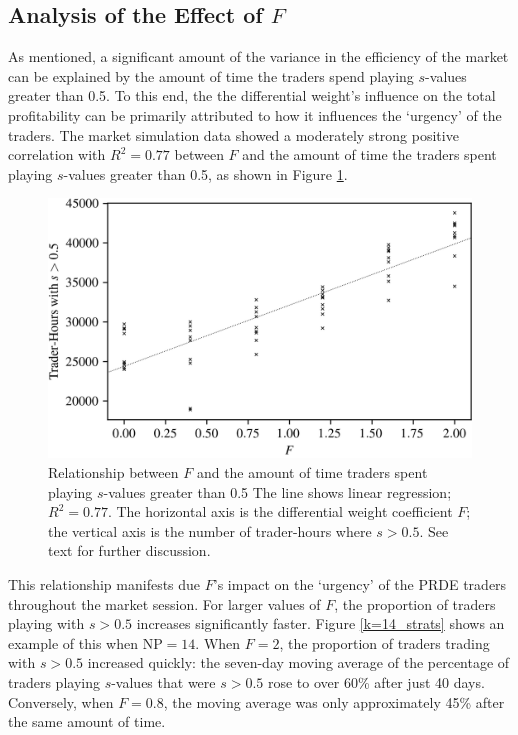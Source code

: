 \documentclass[conference]{IEEEtran}
\begin{document}
\subsection{Analysis of the Effect of $F$}

As mentioned, a significant amount of the variance in the efficiency of the market can be explained by the amount of time the traders spend playing $s$-values greater than 0.5.
To this end, the the differential weight's influence on the total profitability can be primarily attributed to how it influences the `urgency' of the traders.
The market simulation data showed a moderately strong positive correlation with $R^2=0.77$ between $F$ and the amount of time the traders spent playing $s$-values greater than 0.5, as shown in Figure \ref{F_strats}.

\begin{figure}[htbp]
    \centerline{\includegraphics[width=\columnwidth]{F_strats.png}}
    \caption{
        Relationship between $F$ and the amount of time traders spent playing $s$-values greater than 0.5
        The line shows linear regression; $R^2=0.77$.
        The horizontal axis is the differential weight coefficient $F$; the vertical axis is the number of trader-hours where $s>0.5$.
        See text for further discussion.
    }
    \label{F_strats}
\end{figure}

This relationship manifests due $F$'s impact on the `urgency' of the PRDE traders throughout the market session.
For larger values of $F$, the proportion of traders playing with $s>0.5$ increases significantly faster.
Figure \ref{k=14_strats} shows an example of this when $\mathrm{NP}=14$.
When $F=2$, the proportion of traders trading with $s>0.5$ increased quickly: the seven-day moving average of the percentage of traders playing $s$-values that were $s>0.5$ rose to over 60\% after just 40 days.
Conversely, when $F=0.8$, the moving average was only approximately 45\% after the same amount of time.
\end{document}
